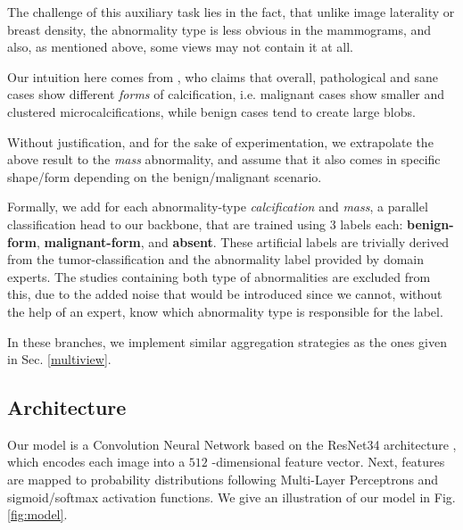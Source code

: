 \documentclass[11pt]{article}
\begin{document}
The challenge of this auxiliary task lies
in the fact, that unlike image laterality or breast density, the abnormality type
is less obvious in the mammograms, and also, as mentioned above, some views
may not contain it at all.

Our intuition here comes from \autocite{azam21}, who claims that overall, pathological and sane
cases show different \emph{forms} of calcification, i.e. malignant cases show smaller and clustered
microcalcifications, while benign cases tend to create large blobs.

Without justification, and for the sake of experimentation,
we extrapolate the above result to the \emph{mass} abnormality, and assume
that it also comes in specific shape/form depending on the benign/malignant
scenario.

Formally, we add for each abnormality-type \emph{calcification} and \emph{mass},
a parallel classification head to our backbone, that are trained using
3 labels each: \textbf{benign-form}, \textbf{malignant-form}, and \textbf{absent}.
These artificial labels are trivially derived from the tumor-classification and
the abnormality label provided by domain experts.
The studies containing both type of abnormalities are excluded from this, due to the added noise that would be introduced since we cannot, without the help of an expert, know which abnormality type is responsible for the label.

In these branches, we implement similar aggregation strategies
as the ones given in Sec. \ref{multiview}.

\subsection{Architecture}
\label{sec:org8897747}

Our model is a Convolution Neural Network based on the ResNet34
architecture \autocite{he15}, which encodes each image into a \(512\) -dimensional feature
vector.
Next, features are mapped to probability distributions following Multi-Layer Perceptrons
and sigmoid/softmax activation functions.
We give an illustration of our model in Fig. \ref{fig:model}.
\end{document}
